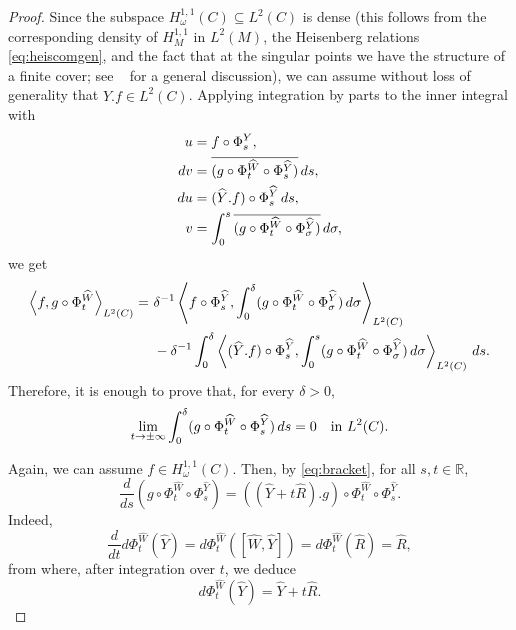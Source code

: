 \documentclass{amsart}
\theoremstyle{definition}
\theoremstyle{remark}
\numberwithin{equation}{section}
\newcommand{\wY}{\widehat{Y}}
\newcommand{\wW}{\widehat{W}}
\newcommand{\<}{{\langle}}
\renewcommand{\>}{{\rangle}}
\begin{document}
\begin{proof}
Since the subspace $H^{1,1}_\omega(C) \subseteq L^2(C)$ is dense (this follows from the corresponding density of $H^{1,1}_{M}$ in $L^2(M)$, the Heisenberg relations \eqref{eq:heiscomgen}, and the fact that at the singular points we have the structure of a finite cover; see ~\cite{Beals} for a general discussion), we can assume without loss of generality that $\widehat{Y}.f \in L^2(C)$. Applying integration by parts to the inner integral with
\begin{align*}
    u &= f\circ \Phi^Y_s, \\
    dv &= \overline{(g \circ \Phi^{\wW}_t \circ \Phi^{\wY}_s)} \thinspace ds,\\
    du &= (\widehat{Y}.f) \circ \Phi^{\wY}_s \thinspace ds,\\
    v &= \int_{0}^s \overline{(g \circ \Phi^{\wW}_t \circ \Phi^{\wY}_\sigma)} \thinspace d\sigma,
\end{align*}
we get
\begin{align}
    \left\langle f, g \circ \Phi^{\wW}_t \right\rangle_{L^2(C)} =  \ &\delta^{-1} \left\langle f\circ \Phi^{\wY}_s,\int_{0}^\delta (g \circ \Phi^{\wW}_t \circ \Phi^{\wY}_\sigma) \thinspace d\sigma \right\rangle_{L^2(C)} \label{eq:corr}\\
    &-\delta^{-1} \int_0^\delta  \left\langle (\widehat{Y}.f) \circ \Phi^{\wY}_s, \int_{0}^s (g \circ \Phi^{\wW}_t \circ \Phi^{\wY}_\sigma) \thinspace d\sigma\right\rangle_{L^2(C)} \thinspace ds. \nonumber
\end{align}
Therefore, it is enough to prove that, for every $\delta > 0$,
\begin{equation}
\label{eq:conv_curves}
\lim_{t \to \pm \infty} \int_{0}^\delta (g \circ \Phi^{\wW}_t \circ \Phi^{\wY}_s) \thinspace ds = 0 \quad \text{in } L^2(C).
\end{equation}

Again, we can assume $f \in H^{1,1}_\omega(C)$. Then, by \eqref{eq:bracket}, for all $s,t \in \mathbb{R}$,
\begin{equation}
\label{eq:ODE}
\frac{d}{ds} (g \circ \Phi^{\wW}_t \circ \Phi^{\wY}_s) = \left(\left(\widehat{Y}+t\widehat{R}\right).g\right) \circ \Phi^{\wW}_t \circ \Phi^{\wY}_s.
\end{equation}
Indeed, 
\[
\frac{d}{dt}d\Phi^{\wW}_t \left(\widehat{Y}\right) = d\Phi^{\wW}_t\left(\left[\widehat{W},\widehat{Y}\right]\right) =  d\Phi^{\wW}_t\left(\widehat{R}\right) = \widehat{R},
\]
from where, after integration over $t$, we deduce
\[
d\Phi^{\wW}_t\left( \widehat{Y} \right) = \widehat{Y} + t \widehat{R}.
\]


\end{proof}
\end{document}
